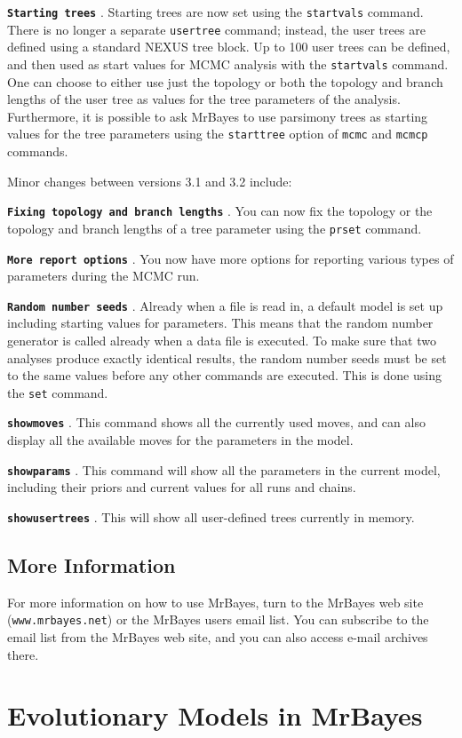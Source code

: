 \documentclass[12pt]{book}
\newcommand{\ttt}[1]{\texttt{#1} }
\newcommand{\tb}[1]{\texttt{\textbf{#1}} }
\begin{document}
\tb{Starting trees}. Starting trees are now set using the \ttt{startvals} command. There is no
longer a separate \ttt{usertree} command; instead, the user trees are defined using a standard
NEXUS tree block. Up to 100 user trees can be defined, and then used as start values for
MCMC analysis with the \ttt{startvals} command. One can choose to either use just the topology or
both the topology and branch lengths of the user tree as values for the tree parameters of the
analysis. Furthermore, it is possible to ask MrBayes to use parsimony trees as starting values for
the tree parameters using the \ttt{starttree} option of \ttt{mcmc} and \ttt{mcmcp} commands.

Minor changes between versions 3.1 and 3.2 include:

\tb{Fixing topology and branch lengths}. You can now fix the topology or the topology and branch
lengths of a tree parameter using the \ttt{prset} command.

\tb{More report options}. You now have more options for reporting various types of parameters
during the MCMC run.

\tb{Random number seeds}. Already when a file is read in, a default model is set up including
starting values for parameters. This means that the random number generator is called already when a data
file is executed. To make sure that two analyses produce exactly identical results, the random number seeds
must be set to the same values before any other commands are executed. This is done using the \ttt{set}
command.

\tb{showmoves}. This command shows all the currently used moves, and can also display all the available
moves for the parameters in the model.

\tb{showparams}. This command will show all the parameters in the current model, including their priors and
current values for all runs and chains.

\tb{showusertrees}. This will show all user-defined trees currently in memory.

\section{More Information}
For more information on how to use MrBayes, turn to the MrBayes web site (\texttt{www.mrbayes.net})
or the MrBayes users email list. You can subscribe to the email list from the MrBayes web site,
and you can also access e-mail archives there.


\chapter{Evolutionary Models in MrBayes}
\label{evolutionaryModels}
\end{document}
